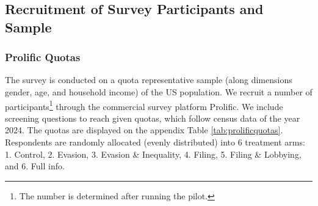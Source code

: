 \documentclass[11pt]{article}
\begin{document}
\subsection{Recruitment of Survey Participants and Sample}
\label{sec:recruitment}
\subsubsection{Prolific Quotas}
The survey is conducted on a quota representative sample (along dimensions gender, age, and household income) of the US population. We recruit a number of participants\footnote{The number is determined after running the pilot.} through the commercial survey platform Prolific. We include screening questions to reach given quotas, which follow census data of the year 2024. The quotas are displayed on the appendix Table \ref{tab:prolificquotas}. Respondents are randomly allocated (evenly distributed) into 6 treatment arms: 1. Control, 2. Evasion, 3. Evasion \& Inequality, 4. Filing, 5. Filing \& Lobbying, and 6. Full info.
\end{document}
